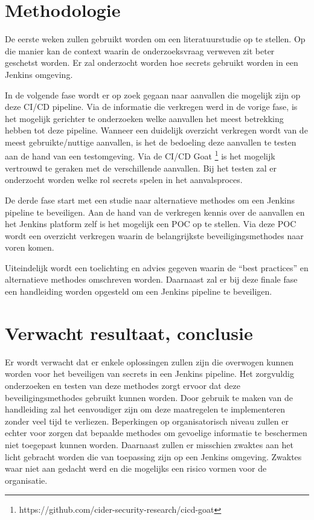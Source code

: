 \section{Methodologie}%
\label{sec:methodologie}

De eerste weken zullen gebruikt worden om een literatuurstudie op te stellen. Op die manier kan de context waarin de onderzoeksvraag verweven zit beter geschetst worden. Er zal onderzocht worden hoe secrets gebruikt worden in een Jenkins omgeving. 

In de volgende fase wordt er op zoek gegaan naar aanvallen die mogelijk zijn op deze CI/CD pipeline. Via de informatie die verkregen werd in de vorige fase, is het mogelijk gerichter te onderzoeken welke aanvallen het meest betrekking hebben tot deze pipeline.  Wanneer een duidelijk overzicht verkregen wordt van de meest gebruikte/nuttige aanvallen, is het de bedoeling deze aanvallen te testen aan de hand van een testomgeving. Via de CI/CD Goat \footnote{https://github.com/cider-security-research/cicd-goat} is het mogelijk vertrouwd te geraken met de verschillende aanvallen. Bij het testen zal er onderzocht worden welke rol secrets spelen in het aanvalsproces.  

De derde fase start met een studie naar alternatieve methodes om  een Jenkins pipeline te beveiligen. Aan de hand van de verkregen kennis over de aanvallen en het Jenkins platform zelf is het mogelijk een POC op te stellen. Via deze POC wordt een overzicht verkregen waarin de belangrijkste beveiligingsmethodes naar voren komen.

Uiteindelijk wordt een toelichting en advies gegeven waarin de “best practices” en alternatieve methodes omschreven worden. Daarnaast zal er bij deze finale fase een handleiding worden opgesteld om een Jenkins pipeline te beveiligen.


\section{Verwacht resultaat, conclusie}%
\label{sec:verwachte_resultaten}

Er wordt verwacht dat er enkele oplossingen zullen zijn die overwogen kunnen worden voor het beveiligen van secrets in een Jenkins pipeline. Het zorgvuldig onderzoeken en testen van deze methodes zorgt ervoor dat deze beveiligingsmethodes gebruikt kunnen worden. Door gebruik te maken van de handleiding zal het eenvoudiger zijn om deze maatregelen te implementeren zonder veel tijd te verliezen. Beperkingen op organisatorisch niveau zullen er echter voor zorgen dat bepaalde methodes om gevoelige informatie te beschermen niet toegepast kunnen worden. Daarnaast zullen er misschien zwaktes aan het licht gebracht worden die van toepassing zijn op een Jenkins omgeving. Zwaktes waar niet aan gedacht werd en die mogelijks een risico vormen voor de organisatie. 
